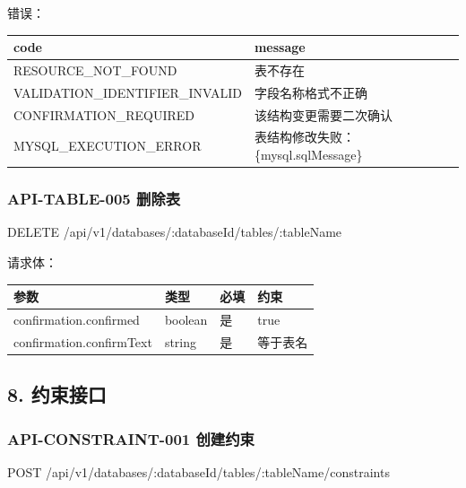 \documentclass[
  a4paper,
  UTF8]{ctexart}
\newenvironment{Shaded}{}{}
\newcommand{\NormalTok}[1]{#1}
\begin{document}
错误：

\begin{longtable}[]{@{}ll@{}}
\toprule
code & message \\
\midrule
\endhead
RESOURCE\_NOT\_FOUND & 表不存在 \\
VALIDATION\_IDENTIFIER\_INVALID & 字段名称格式不正确 \\
CONFIRMATION\_REQUIRED & 该结构变更需要二次确认 \\
MYSQL\_EXECUTION\_ERROR & 表结构修改失败：\{mysql.sqlMessage\} \\
\bottomrule
\end{longtable}

\hypertarget{api-table-005-ux5220ux9664ux8868}{%
\subsubsection{API-TABLE-005
删除表}\label{api-table-005-ux5220ux9664ux8868}}

\begin{Shaded}
\begin{Highlighting}[]
\NormalTok{DELETE /api/v1/databases/:databaseId/tables/:tableName}
\end{Highlighting}
\end{Shaded}

请求体：

\begin{longtable}[]{@{}llll@{}}
\toprule
参数 & 类型 & 必填 & 约束 \\
\midrule
\endhead
confirmation.confirmed & boolean & 是 & true \\
confirmation.confirmText & string & 是 & 等于表名 \\
\bottomrule
\end{longtable}

\hypertarget{ux7ea6ux675fux63a5ux53e3}{%
\subsection{8. 约束接口}\label{ux7ea6ux675fux63a5ux53e3}}

\hypertarget{api-constraint-001-ux521bux5efaux7ea6ux675f}{%
\subsubsection{API-CONSTRAINT-001
创建约束}\label{api-constraint-001-ux521bux5efaux7ea6ux675f}}

\begin{Shaded}
\begin{Highlighting}[]
\NormalTok{POST /api/v1/databases/:databaseId/tables/:tableName/constraints}
\end{Highlighting}
\end{Shaded}
\end{document}
